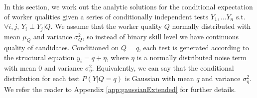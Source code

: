 In this section, we work out the analytic solutions for the conditional expectation of worker qualities given a series of conditionally independent tests $Y_1, ... Y_n$ s.t. $\forall i,j$, $Y_i \perp  Y_j |Q$.
We assume that the worker quality $Q$ normally distributed with mean $\mu_Q$ and variance $\sigma_Q^2$, so instead of binary skill level we have continuous quality of candidates.
Conditioned on $Q=q$, each test is generated according to the structural equation 
$y_i = q + \eta$, where $\eta$ is a normally distributed noise term
with mean $0$ and variance $\sigma_\eta^2$.
Equivalently, we can say that the conditional 
distribution for each test $P(Y|Q=q)$
is Gaussian with mean $q$ and variance $\sigma_\eta^2$. 
We refer the reader to Appendix \ref{app:gaussianExtended}
for further details.

